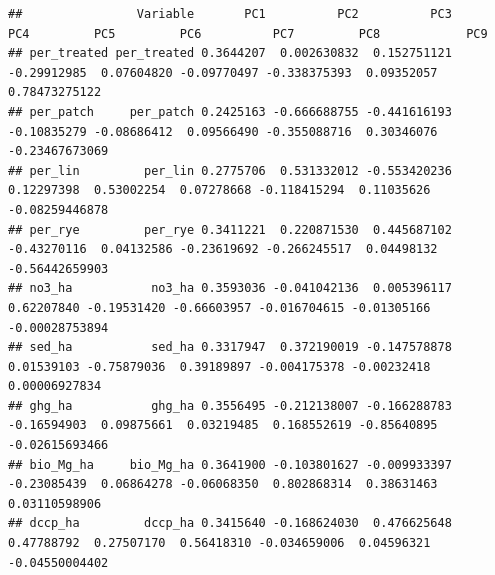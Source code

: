 \documentclass[
]{article}
\newenvironment{Shaded}{\begin{snugshade}}{\end{snugshade}}
\newcommand{\AttributeTok}[1]{\textcolor[rgb]{0.13,0.29,0.53}{#1}}
\newcommand{\CommentTok}[1]{\textcolor[rgb]{0.56,0.35,0.01}{\textit{#1}}}
\newcommand{\ConstantTok}[1]{\textcolor[rgb]{0.56,0.35,0.01}{#1}}
\newcommand{\FunctionTok}[1]{\textcolor[rgb]{0.13,0.29,0.53}{\textbf{#1}}}
\newcommand{\NormalTok}[1]{#1}
\newcommand{\OtherTok}[1]{\textcolor[rgb]{0.56,0.35,0.01}{#1}}
\newcommand{\SpecialCharTok}[1]{\textcolor[rgb]{0.81,0.36,0.00}{\textbf{#1}}}
\newcommand{\StringTok}[1]{\textcolor[rgb]{0.31,0.60,0.02}{#1}}
\begin{document}
\begin{Shaded}
\end{Shaded}

\begin{verbatim}
##                Variable       PC1          PC2          PC3         PC4         PC5         PC6          PC7         PC8            PC9
## per_treated per_treated 0.3644207  0.002630832  0.152751121 -0.29912985  0.07604820 -0.09770497 -0.338375393  0.09352057  0.78473275122
## per_patch     per_patch 0.2425163 -0.666688755 -0.441616193 -0.10835279 -0.08686412  0.09566490 -0.355088716  0.30346076 -0.23467673069
## per_lin         per_lin 0.2775706  0.531332012 -0.553420236  0.12297398  0.53002254  0.07278668 -0.118415294  0.11035626 -0.08259446878
## per_rye         per_rye 0.3411221  0.220871530  0.445687102 -0.43270116  0.04132586 -0.23619692 -0.266245517  0.04498132 -0.56442659903
## no3_ha           no3_ha 0.3593036 -0.041042136  0.005396117  0.62207840 -0.19531420 -0.66603957 -0.016704615 -0.01305166 -0.00028753894
## sed_ha           sed_ha 0.3317947  0.372190019 -0.147578878  0.01539103 -0.75879036  0.39189897 -0.004175378 -0.00232418  0.00006927834
## ghg_ha           ghg_ha 0.3556495 -0.212138007 -0.166288783 -0.16594903  0.09875661  0.03219485  0.168552619 -0.85640895 -0.02615693466
## bio_Mg_ha     bio_Mg_ha 0.3641900 -0.103801627 -0.009933397 -0.23085439  0.06864278 -0.06068350  0.802868314  0.38631463  0.03110598906
## dccp_ha         dccp_ha 0.3415640 -0.168624030  0.476625648  0.47788792  0.27507170  0.56418310 -0.034659006  0.04596321 -0.04550004402
\end{verbatim}
\end{document}
